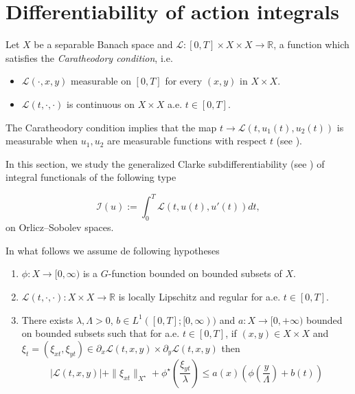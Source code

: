 \documentclass[twoside]{article}
\makeatletter
\theoremstyle{definition}
\theoremstyle{plain}
\theoremstyle{remark}
\newcommand{\labitem}[2]{%
\def\@itemlabel{\textnormal{\textbf{(#1)}}}
\item
\def\@currentlabel{\textnormal{\textbf{(#1)}}}\label{#2}}
\makeatother
\begin{document}
 \section{Differentiability of action integrals}

 Let $X$ be a separable Banach space and $\mathcal{L}:[0,T]\times X\times X \rightarrow \mathbb{R}$, a function which satisfies the \textit{ Caratheodory condition}, i.e.

\begin{itemize}\label{caratherodory}
    \item $\mathcal{L}(\cdot,x,y)$ measurable on $[0,T]$ for every $(x,y)$ in $X\times X$.
    \item $\mathcal{L}(t,\cdot,\cdot)$ is continuous on $X\times X$ a.e. $t\in [0,T]$.
\end{itemize}

The Caratheodory condition implies that the map $t\to \mathcal{L}(t,u_1(t),u_2(t))$ is measurable when $u_1,u_2$ are measurable functions with  respect $t$ (see \cite[Sección 6.2]{papageorgiou2009handbook}).

In this section, we study the generalized Clarke subdifferentiability (see \cite{papageorgiou2009handbook,clarke2013functional,clarke1990optimization}) of integral functionals of the following type


\begin{equation}\label{integraldeacción}
  \mathcal{I}(u):= \int_0^T \mathcal{L}(t,u(t),u'(t))  dt,  \tag{IA}
\end{equation}
 on Orlicz–Sobolev spaces.

In what follows we assume de following hypotheses

\begin{enumerate}

 \labitem{H10}{hip1dif} $\phi:X \rightarrow [0,\infty)$ is a  $G$-function  bounded on bounded subsets of $X$.

  \labitem{H11}{hip2dif} $\mathcal{L}(t,\cdot,\cdot):X\times X \rightarrow \mathbb{R}$ is locally Lipschitz and regular for a.e. $t \in [0,T]$.


 \labitem{H12}{hip3dif}

 There exists $\lambda, \Lambda > 0$, $b \in L^1([0,T];[0,\infty))$ and $a:X \rightarrow [0,+\infty) $ bounded on bounded subsets such that for a.e. $t \in [0,T]$, if
$ (x,y) \in X\times X$ and $\xi_t=(\xi_{xt},\xi_{yt}) \in \partial_{x}\mathcal{L}(t,x,y)\times\partial_{y}\mathcal{L}(t,x,y)$ then
      \begin{equation}\label{Hip4}
          |\mathcal{L}(t,x,y)| + \|\xi_{xt}\|_{X^\star}+\phi^\star \left(\frac{\xi_{yt}}{\lambda}\right) \leq a(x) \left(\phi \left(\frac{y}{\Lambda}\right)+ b(t)\right)
     \end{equation}
\end{enumerate}
\end{document}
